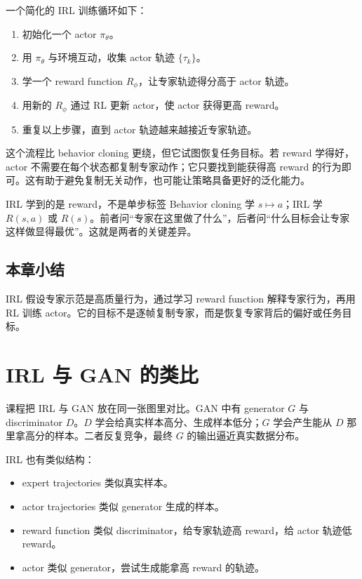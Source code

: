 \documentclass[a4paper]{article}
\newcommand{\traj}{\tau}
\newcommand{\reward}{R_\phi}
\begin{document}
一个简化的 IRL 训练循环如下：
\begin{enumerate}
    \item 初始化一个 actor $\pi_\theta$。
    \item 用 $\pi_\theta$ 与环境互动，收集 actor 轨迹 $\{\traj_k\}$。
    \item 学一个 reward function $\reward$，让专家轨迹得分高于 actor 轨迹。
    \item 用新的 $\reward$ 通过 RL 更新 actor，使 actor 获得更高 reward。
    \item 重复以上步骤，直到 actor 轨迹越来越接近专家轨迹。
\end{enumerate}

这个流程比 behavior cloning 更绕，但它试图恢复任务目标。若 reward 学得好，actor 不需要在每个状态都复制专家动作；它只要找到能获得高 reward 的行为即可。这有助于避免复制无关动作，也可能让策略具备更好的泛化能力。

\begin{knowledgebox}{IRL 学到的是 reward，不是单步标签}
    Behavior cloning 学 $s\mapsto a$；IRL 学 $R(s,a)$ 或 $R(s)$。前者问``专家在这里做了什么''，后者问``什么目标会让专家这样做显得最优''。这就是两者的关键差异。
\end{knowledgebox}

\subsection{本章小结}

IRL 假设专家示范是高质量行为，通过学习 reward function 解释专家行为，再用 RL 训练 actor。它的目标不是逐帧复制专家，而是恢复专家背后的偏好或任务目标。

\section{IRL 与 GAN 的类比}

课程把 IRL 与 GAN 放在同一张图里对比。GAN 中有 generator $G$ 与 discriminator $D$。$D$ 学会给真实样本高分、生成样本低分；$G$ 学会产生能从 $D$ 那里拿高分的样本。二者反复竞争，最终 $G$ 的输出逼近真实数据分布。

IRL 也有类似结构：
\begin{itemize}
    \item expert trajectories 类似真实样本。
    \item actor trajectories 类似 generator 生成的样本。
    \item reward function 类似 discriminator，给专家轨迹高 reward，给 actor 轨迹低 reward。
    \item actor 类似 generator，尝试生成能拿高 reward 的轨迹。
\end{itemize}
\end{document}
